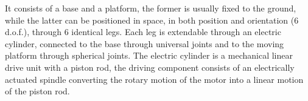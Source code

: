 \documentclass[]{interact}
\theoremstyle{plain}%
\theoremstyle{definition}
\theoremstyle{remark}
\begin{document}
It consists of a base and a platform, the former is usually fixed to the ground, while the latter can be positioned in space, in both position and orientation (6 d.o.f.), through 6 identical legs. Each leg is extendable through an electric cylinder, connected to the base through universal joints and to the moving platform through spherical joints. The electric cylinder is a mechanical linear drive unit with a piston rod, the driving component consists of an electrically actuated spindle converting the rotary motion of the motor into a linear motion of the piston rod.

\begin{figure}
\centering
{}
\end{figure}
\end{document}
